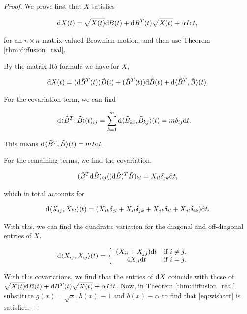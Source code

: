 \begin{proof}

    We prove first that $X$ satisfies

    \begin{equation*}
        \mathrm d X(t) = \sqrt{X(t)} \mathrm d B(t) + \mathrm d B^T(t) \sqrt{X(t)} + \alpha I \mathrm d t,
    \end{equation*}

    for an $n\times n$ matrix-valued Brownian motion, and then use Theorem \ref{thm:diffusion_real}. 

    By the matrix Itô formula we have for $X$,

    \begin{equation*}
        \mathrm d X(t) = (\mathrm d \tilde B^T(t)) \tilde B(t) + (\tilde B^T(t)) \mathrm d \tilde B(t) + \mathrm d \langle \tilde B^T, \tilde B \rangle(t).
    \end{equation*}

    For the covariation term, we can find

    \begin{align*}
        \mathrm d \langle \tilde B^T, \tilde B \rangle(t)_{ij} &= \sum_{k=1}^m \mathrm d \langle \tilde B_{ki}, \tilde B_{kj} \rangle(t) = m\delta_{ij} \mathrm d t.
    \end{align*}

    This means $\mathrm d \langle \tilde B^T, \tilde B \rangle(t) = m I \mathrm d t$.

    For the remaining terms, we find the covariation,

    \begin{equation*}
        (\tilde B^T \mathrm d \tilde B)_{ij} ((\mathrm d \tilde B)^T\tilde B)_{kl} = X_{il}\delta_{jk} \mathrm d t,
    \end{equation*}

    \noindent which in total accounts for 

    \begin{equation*}
        \mathrm d \langle X_{ij}, X_{kl} \rangle(t) = ( X_{ik}\delta_{jl} + X_{il}\delta_{jk} + X_{jk}\delta_{il} + X_{jl}\delta_{ik} )\mathrm d t.
    \end{equation*}

    With this, we can find the quadratic variation for the diagonal and off-diagonal entries of $X$.

    \begin{align*}
        \mathrm d \langle X_{ij}, X_{ij} \rangle (t) &= \left\{ \begin{array}{cc}
            (X_{ii} + X_{jj})\mathrm d t & \text{if $i\neq j$},\\
            4 X_{ii} \mathrm d t & \text{if $i=j$}.
        \end{array} \right.
    \end{align*}

    With this covariations, we find that the entries of $\mathrm d X$ coincide with those of $\sqrt{X(t)} \mathrm d B(t) + \mathrm d B^T(t) \sqrt{X(t)} + \alpha I \mathrm d t$. Now, in Theorem \ref{thm:diffusion_real} substitute $g(x) = \sqrt{x}, h(x) \equiv 1$ and $b(x) \equiv \alpha$ to find that \eqref{eq:wishart} is satisfied.
\end{proof}

